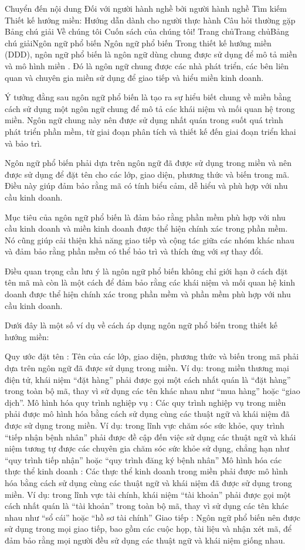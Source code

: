 Chuyển đến nội dung
Đối với người hành nghề bởi người hành nghề
Tìm kiếm
Thiết kế hướng miền: Hướng dẫn dành cho người thực hành
Câu hỏi thường gặp
Bảng chú giải
Về chúng tôi
Cuốn sách của chúng tôi!
Trang chủTrang chủBảng chú giảiNgôn ngữ phổ biến
Ngôn ngữ phổ biến
Trong thiết kế hướng miền (DDD), ngôn ngữ phổ biến là ngôn ngữ dùng chung được sử dụng để mô tả miền và mô hình miền . Đó là ngôn ngữ chung được các nhà phát triển, các bên liên quan và chuyên gia miền sử dụng để giao tiếp và hiểu miền kinh doanh.

Ý tưởng đằng sau ngôn ngữ phổ biến là tạo ra sự hiểu biết chung về miền bằng cách sử dụng một ngôn ngữ chung để mô tả các khái niệm và mối quan hệ trong miền. Ngôn ngữ chung này nên được sử dụng nhất quán trong suốt quá trình phát triển phần mềm, từ giai đoạn phân tích và thiết kế đến giai đoạn triển khai và bảo trì.

Ngôn ngữ phổ biến phải dựa trên ngôn ngữ đã được sử dụng trong miền và nên được sử dụng để đặt tên cho các lớp, giao diện, phương thức và biến trong mã. Điều này giúp đảm bảo rằng mã có tính biểu cảm, dễ hiểu và phù hợp với nhu cầu kinh doanh.

Mục tiêu của ngôn ngữ phổ biến là đảm bảo rằng phần mềm phù hợp với nhu cầu kinh doanh và miền kinh doanh được thể hiện chính xác trong phần mềm. Nó cũng giúp cải thiện khả năng giao tiếp và cộng tác giữa các nhóm khác nhau và đảm bảo rằng phần mềm có thể bảo trì và thích ứng với sự thay đổi.

Điều quan trọng cần lưu ý là ngôn ngữ phổ biến không chỉ giới hạn ở cách đặt tên mã mà còn là một cách để đảm bảo rằng các khái niệm và mối quan hệ kinh doanh được thể hiện chính xác trong phần mềm và phần mềm phù hợp với nhu cầu kinh doanh.

Dưới đây là một số ví dụ về cách áp dụng ngôn ngữ phổ biến trong thiết kế hướng miền:

Quy ước đặt tên : Tên của các lớp, giao diện, phương thức và biến trong mã phải dựa trên ngôn ngữ đã được sử dụng trong miền. Ví dụ: trong miền thương mại điện tử, khái niệm “đặt hàng” phải được gọi một cách nhất quán là “đặt hàng” trong toàn bộ mã, thay vì sử dụng các tên khác nhau như “mua hàng” hoặc “giao dịch”.
Mô hình hóa quy trình nghiệp vụ : Các quy trình nghiệp vụ trong miền phải được mô hình hóa bằng cách sử dụng cùng các thuật ngữ và khái niệm đã được sử dụng trong miền. Ví dụ: trong lĩnh vực chăm sóc sức khỏe, quy trình “tiếp nhận bệnh nhân” phải được đề cập đến việc sử dụng các thuật ngữ và khái niệm tương tự được các chuyên gia chăm sóc sức khỏe sử dụng, chẳng hạn như “quy trình tiếp nhận” hoặc “quy trình đăng ký bệnh nhân”
Mô hình hóa các thực thể kinh doanh : Các thực thể kinh doanh trong miền phải được mô hình hóa bằng cách sử dụng cùng các thuật ngữ và khái niệm đã được sử dụng trong miền. Ví dụ: trong lĩnh vực tài chính, khái niệm “tài khoản” phải được gọi một cách nhất quán là “tài khoản” trong toàn bộ mã, thay vì sử dụng các tên khác nhau như “sổ cái” hoặc “hồ sơ tài chính”
Giao tiếp : Ngôn ngữ phổ biến nên được sử dụng trong mọi giao tiếp, bao gồm các cuộc họp, tài liệu và nhận xét mã, để đảm bảo rằng mọi người đều sử dụng các thuật ngữ và khái niệm giống nhau.

